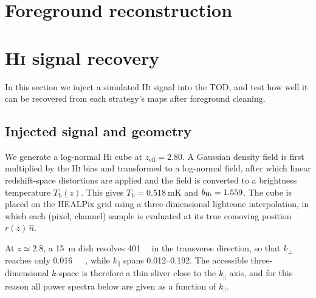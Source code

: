 \documentclass[a4paper,fleqn,usenatbib]{mnras}
\newcommand{\kpar}{k_{\parallel}}
\newcommand{\kperp}{k_{\perp}}
\newcommand{\Tb}{T_{\mathrm{b}}}
\begin{document}

\section{Foreground reconstruction}
\label{sec:foreground}


\section{\textsc{Hi} signal recovery}
\label{sec:hi}

In this section we inject a simulated \textsc{Hi} signal into the TOD, and test
how well it can be recovered from each strategy's maps after foreground
cleaning.

\subsection{Injected signal and geometry}
We generate a log-normal \textsc{Hi} cube at $z_{\mathrm{eff}} = 2.80$. A
Gaussian density field is first multiplied by the \textsc{Hi} bias and
transformed to a log-normal field, after which linear redshift-space
distortions are applied and the field is converted to a brightness temperature
$\Tb(z)$. This gives $\Tb = \SI{0.518}{\milli\kelvin}$ and
$b_{\mathrm{\textsc{Hi}}} = 1.559$.
The cube is placed on the HEALPix grid using a three-dimensional lightcone
interpolation, in which each (pixel, channel) sample is evaluated at its true
comoving position $r(z)\,\hat{n}$.

At $z \simeq 2.8$, a \SI{15}{\metre} dish resolves \SI{401}{\mega\parsec} in the
transverse direction, so that $\kperp$ reaches only
\SI{0.016}{\per\mega\parsec}, while $\kpar$ spans \numrange{0.012}{0.192}. The
accessible three-dimensional $k$-space is therefore a thin sliver close to the
$\kpar$ axis, and for this reason all power spectra below are given as a
function of $\kpar$.
\end{document}
